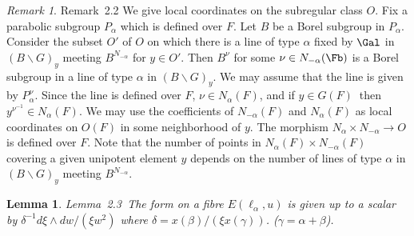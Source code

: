 \documentclass{memo-l}
\newtheorem{lemma}[theorem]{Lemma}
\theoremstyle{definition}
\theoremstyle{remark}
\newtheorem{remark}[theorem]{Remark}
\numberwithin{section}{chapter}
\numberwithin{equation}{chapter}
\begin{document}
\begin{remark}{Remark\ 2.2} We give local coordinates on the subregular
class $O$.  Fix a parabolic subgroup $P_{{\alpha}}$ which is defined over
$F$.  Let $B$ be a Borel subgroup in $P_{{\alpha}}$.  Consider the subset
$O'$ of $O$ on which there is a line of type ${\alpha}$ fixed by $\Gal$ 
in $(B\backslash G)_{y}$ meeting $B^{N_{-{\alpha}}}$ for $y
\in O'$.  Then $B^{{\nu}}$ for some ${\nu} \in N_{-{\alpha}}(\Fb)$ 
is a Borel subgroup in a line of type ${\alpha}$ in $(B\backslash
G)_{y}$.  We may assume that the line is given by 
$P_{{\alpha}}^{{\nu}}$.  Since the line is defined over $F$, ${\nu} \in
N_{{\alpha}}(F)$, and if $y \in G(F)\ $ then  $y^{\nu^{-1}} \in
N_{{\alpha}}(F)$.  We may use the coefficients of $N_{-{\alpha}}(F)$ and
$N_{{\alpha}}(F)$ as local coordinates on $O(F)$ in some neighborhood of
$y$.  The morphism $N_{{\alpha}} \times N_{-{\alpha}} {\to} O$ is defined
over $F$.  Note that the number of points in $N_{{\alpha}}(F) \times
N_{-{\alpha}}(F)$ covering a given unipotent element $y$ depends on the
number of lines of type ${\alpha}$ in $(B\backslash G)_{y}$ meeting 
$B^{N_{-{\alpha}}}.$ 
\end{remark}

\medpagebreak

\begin{lemma}{Lemma\ 2.3}\  The form on a fibre $E({\ell}_{{\alpha}},u)$ is
given up to a scalar by ${\delta}^{-1}d{\xi}\wedge dw/({\xi}w^{2})$ where
${\delta} = x({\beta})/({\xi}x({\gamma}))$. ($\gamma=\alpha+\beta$).
\end{lemma}
\end{document}
